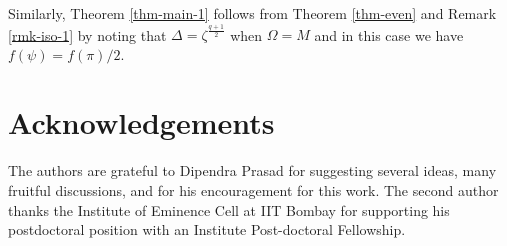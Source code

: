 \documentclass[12pt]{amsart}
\theoremstyle{definition}
\theoremstyle{remark}
\begin{document}
Similarly, Theorem \ref{thm-main-1} follows from Theorem \ref{thm-even} and Remark \ref{rmk-iso-1} by noting that $\Delta = \zeta^{\frac{q+1}{2}}$ when $\Omega = M$ and in this case we have $f(\psi) = f(\pi)/2$.  

\section*{Acknowledgements}

The authors are grateful to Dipendra Prasad for suggesting several ideas, many fruitful discussions, and for his encouragement for this work. The second author thanks the Institute of Eminence Cell at IIT Bombay for supporting his postdoctoral position with an Institute Post-doctoral Fellowship.

%
%
\end{document}
